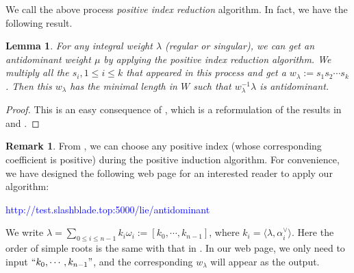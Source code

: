 \documentclass[reqno,12pt]{amsart}
\numberwithin{equation}{section}
\theoremstyle{plain}
\newtheorem{Lem}[Thm]{Lemma}
\theoremstyle{definition}
\newtheorem{Rem}[Thm]{Remark}
\newcommand{\lam}{\lambda}
\newcommand{\lest}{\leqslant}
\begin{document}
We call the above process \emph{positive index reduction} algorithm.  In fact, we have the following result.



\begin{Lem}\label{find-w-lambda}
    For any integral weight $\lam$ (regular or singular),  we can get an antidominant weight $\mu$ by applying the positive index reduction algorithm. We multiply all the $s_i, 1\lest i \lest k$ that appeared in this process and get a $w_{\lambda}:=s_1 s_2 \cdots s_k$. Then this $w_{\lambda}$ has the minimal length in $W$ such that $w_{\lambda}^{-1}\lam$ is antidominant.
\end{Lem}
 \begin{proof}
     This is an easy consequence of \cite[Lem. 3.1]{do23}, which is a reformulation of the results in 
     \cite[Thm. 4.3.1(iv)]{BB05} and \cite[Prop. 4.1]{Er95}.
 \end{proof}

\begin{Rem}
    From \cite[Lem. 3.1]{do23},  we can choose any positive index (whose corresponding coefficient is positive) during the positive induction algorithm. 
For convenience, we have designed   the following web page for an interested reader to apply our algorithm:
    \begin{center}
\textcolor{blue}{http://test.slashblade.top:5000/lie/antidominant}
    \end{center}
We write $\lam=\sum\limits_{0\lest i\lest n-1}k_i\omega_i:=[k_0,\cdots,k_{n-1}]$, where $k_i=\langle \lam, \alpha_i^{\vee}\rangle$. Here  the order of simple roots is the same with that in \cite{ge}. In our web page, we only need to input $``k_0,\cdots,k_{n-1}"$, and the corresponding $w_{\lambda}$ will appear as the output.

    
\end{Rem}



 
\end{document}
